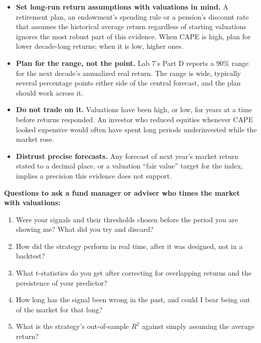 \begin{itemize}
  \item \textbf{Set long-run return assumptions with valuations in mind.} A retirement plan, an endowment's spending rule or a pension's discount rate that assumes the historical average return regardless of starting valuations ignores the most robust part of this evidence. When CAPE is high, plan for lower decade-long returns; when it is low, higher ones.
  \item \textbf{Plan for the range, not the point.} Lab 7's Part D reports a 90\% range for the next decade's annualized real return. The range is wide, typically several percentage points either side of the central forecast, and the plan should work across it.
  \item \textbf{Do not trade on it.} Valuations have been high, or low, for years at a time before returns responded. An investor who reduced equities whenever CAPE looked expensive would often have spent long periods underinvested while the market rose.
  \item \textbf{Distrust precise forecasts.} Any forecast of next year's market return stated to a decimal place, or a valuation ``fair value'' target for the index, implies a precision this evidence does not support.
\end{itemize}

\textbf{Questions to ask a fund manager or adviser who times the market with valuations:}

\begin{enumerate}
  \item Were your signals and their thresholds chosen before the period you are showing me? What did you try and discard?
  \item How did the strategy perform in real time, after it was designed, not in a backtest?
  \item What t-statistics do you get after correcting for overlapping returns and the persistence of your predictor?
  \item How long has the signal been wrong in the past, and could I bear being out of the market for that long?
  \item What is the strategy's out-of-sample $R^2$ against simply assuming the average return?
\end{enumerate}

